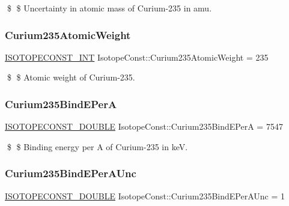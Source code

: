 \$ \$ Uncertainty in atomic mass of Curium-\/235 in amu. \mbox{\label{group___isotope_const-_curium-_cm235_gaa244b02e63ddfe3cb7950fb7bedeb406}} 
\subsubsection{\texorpdfstring{Curium235\+Atomic\+Weight}{Curium235AtomicWeight}}
{\footnotesize\ttfamily \mbox{\hyperlink{group___isotope_const-_macros_ga5f18360b3e99483a35c32d789e62621c}{I\+S\+O\+T\+O\+P\+E\+C\+O\+N\+S\+T\+\_\+\+I\+NT}} Isotope\+Const\+::\+Curium235\+Atomic\+Weight = 235}

\$ \$ Atomic weight of Curium-\/235. \mbox{\label{group___isotope_const-_curium-_cm235_ga32e5747a86a6ac8c412eb830dc8760d0}} 
\subsubsection{\texorpdfstring{Curium235\+Bind\+E\+PerA}{Curium235BindEPerA}}
{\footnotesize\ttfamily \mbox{\hyperlink{group___isotope_const-_macros_ga8f45a7272ce02c0b4c65c44636ed719a}{I\+S\+O\+T\+O\+P\+E\+C\+O\+N\+S\+T\+\_\+\+D\+O\+U\+B\+LE}} Isotope\+Const\+::\+Curium235\+Bind\+E\+PerA = 7547}

\$ \$ Binding energy per A of Curium-\/235 in keV. \mbox{\label{group___isotope_const-_curium-_cm235_ga7578a6de6b716a536fdf09051cb34594}} 
\subsubsection{\texorpdfstring{Curium235\+Bind\+E\+Per\+A\+Unc}{Curium235BindEPerAUnc}}
{\footnotesize\ttfamily \mbox{\hyperlink{group___isotope_const-_macros_ga8f45a7272ce02c0b4c65c44636ed719a}{I\+S\+O\+T\+O\+P\+E\+C\+O\+N\+S\+T\+\_\+\+D\+O\+U\+B\+LE}} Isotope\+Const\+::\+Curium235\+Bind\+E\+Per\+A\+Unc = 1}

